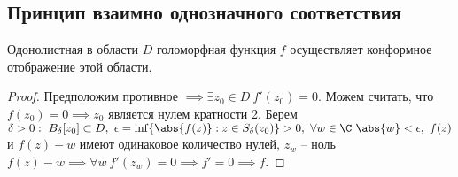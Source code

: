 \subsection{Принцип взаимно однозначного соответствия}

\begin{theorem}
	Одонолистная в области $D$ голоморфная функция $f$ осуществляет конформное отображение этой области.
\end{theorem}

\begin{proof}
	Предположим противное $\implies \exists z_0 \in D \ f '(z_0) = 0$. Можем считать, что $f(z_0) = 0 \implies z_0$ является нулем кратности 2. Берем $\delta >0: \ B_{\delta }[z_0] \subset D, \ \epsilon = \inf \{\abs{f(z)} : z \in S_{\delta } (z_0)\}> 0, \ \forall w \in \C \ \abs{w} < \epsilon , \ f(z)$ и $f(z)-w$ имеют одинаковое количество нулей, $z_w$ -- ноль $f(z)-w \implies \forall w \ f '(z_w) = 0 \implies f ' = 0 \implies f$.
\end{proof}
